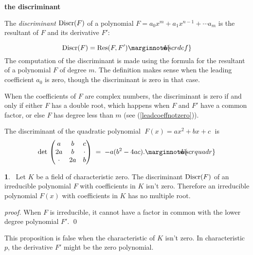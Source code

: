 \documentclass[leqno]{book}
\newcommand\Marginnote[1]{\marginnote{\hspace{-12pt}\normalfont{#1}}}
\renewcommand\theequation{\thesection.\arabic{equation}}
\newenvironment{boldequation}{\renewcommand\theequation{\textbf{\thesection.\arabic{equation}}}\equation}
   {\endequation}
\theoremstyle{definition}%
\numberwithin{equation}{section}
\theoremstyle{theorem} %
\newtheorem{proposition}[equation]{}
\renewenvironment{proof}{\no \emph{proof.}}{}
\begin{document}
\begin{boldequation}\Marginnote{discrimsect} 
\hspace{-10cm} \textbf{the discriminant} 
\label{discrimsect}\end{boldequation}

 The {\it discriminant} $\operatorname{Discr}(F)$ of a
polynomial $F = a_0x^m+a_1x^{n-1} + \cdots a_m $ is the resultant
of $F$ and its derivative $F'$:

\begin{equation}\label{discrdef}
\discr(F) =\res(F,F')\Marginnote{discrdef}
\end{equation} 
The computation of the discriminant is made using the formula for the resultant of a
polynomial $F$ of degree $m$.  The definition makes sense when
the leading coefficient $a_0$ is zero, though the discriminant is zero in
that case.

\ms
 When the coefficients of $F$ are complex numbers, the discriminant
 is zero if and only if either $F$ has a double root,
 which happens when $F$ and $F'$ have a common factor, or else $F$ has
 degree less than $m$ (see (\ref{leadcoeffnotzero})).

\ms
The discriminant of the quadratic polynomial
$\;F(x)=ax^2+bx+c\;$ is
\begin{equation}
\det  \begin{pmatrix} a & b & c\\ 2a & b & \cdot\\
\cdot & 2a & b\end{pmatrix} \; = \;
 -a(b^2-4ac). 
\Marginnote{discrquadr} \label{discrquadr}
\end{equation}


\begin{proposition}{}\Marginnote{discrnotzero}\;\,
Let $K$ be a field of characteristic zero.  The discriminant
$\operatorname{Discr}(F)$ of an irreducible polynomial $F$ with
coefficients in $K$ isn't zero.  Therefore an irreducible polynomial
$F(x)$ with coefficients in $K$ has no multiple root.
\label{discrnotzero}\end{proposition}

\begin{proof} When  $F$ is
irreducible, it cannot have a factor in common with the lower degree
polynomial $F'$.  
\qed \end{proof}

\msno This proposition is false when the characteristic of $K$ isn't
zero.  In characteristic $p$, the derivative $F'$ might be the zero
polynomial.
\end{document}
